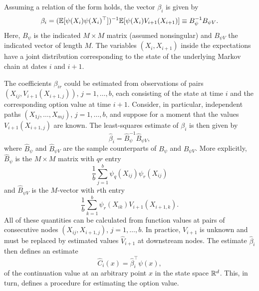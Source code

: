 Assuming a relation of the form  holds, the vector \(\beta_i\) is given by
\begin{equation} \label{eq:BetaVectorDefinition}
	\beta_i = (\mathbb{E}[\psi(X_i)\psi(X_i)^\top])^{-1} \mathbb{E}[\psi(X_i)V_{i+1}(X_{i+1})] \equiv B_\psi^{-1} B_{\psi V}.
\end{equation}
Here, \(B_\psi\) is the indicated \(M \times M\) matrix (assumed nonsingular) and \(B_{\psi V}\) the indicated vector of length \(M\). The variables \((X_i, X_{i+1})\) inside the expectations have a joint distribution corresponding to the state of the underlying Markov chain at dates \(i\) and \(i+1\).

The coefficients \(\beta_{ir}\) could be estimated from observations of pairs \((X_{ij}, V_{i+1}(X_{i+1,j}))\), \(j = 1, \dots, b\), each consisting of the state at time \(i\) and the corresponding option value at time \(i+1\). Consider, in particular, independent paths \((X_{1j}, \dots, X_{mj})\), \(j = 1, \dots, b\), and suppose for a moment that the values \(V_{i+1}(X_{i+1,j})\) are known. The least-squares estimate of \(\beta_i\) is then given by
\begin{equation*}
	\hat{\beta}_i = \hat{B}_\psi^{-1} \hat{B}_{\psi V},
\end{equation*}
where \(\hat{B}_\psi\) and \(\hat{B}_{\psi V}\) are the sample counterparts of \(B_\psi\) and \(B_{\psi V}\). More explicitly, \(\hat{B}_\psi\) is the \(M \times M\) matrix with \(qr\) entry
\begin{equation*}
	\frac{1}{b} \sum_{j=1}^b \psi_q(X_{ij}) \psi_r(X_{ij})
\end{equation*}
and \(\hat{B}_{\psi V}\) is the \(M\)-vector with \(r\)th entry
\begin{equation} \label{eq:SampleCounterpartVector}
	\frac{1}{b} \sum_{k=1}^b \psi_r(X_{ik}) V_{i+1}(X_{i+1, k}).
\end{equation}
All of these quantities can be calculated from function values at pairs of consecutive nodes \((X_{ij}, X_{i+1, j})\), \(j = 1, \dots, b\). In practice, \(V_{i+1}\) is unknown and must be replaced by estimated values \(\hat{V}_{i+1}\) at downstream nodes. The estimate \(\hat{\beta}_i\) then defines an estimate
\begin{equation} \label{eq:EstimatedContinuationValue}
	\hat{C}_i(x) = \hat{\beta}_i^\top \psi(x),
\end{equation}
of the continuation value at an arbitrary point \(x\) in the state space \(\mathbb{R}^d\). This, in turn, defines a procedure for estimating the option value.

